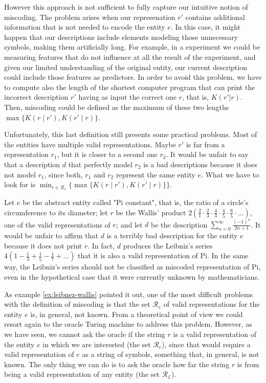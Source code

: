 However this approach is not sufficient to fully capture our intuitive notion of miscoding. The problem arises when our represenation $r'$ contains additional information that is not needed to encode the entity $e$. In this case, it might happen that our descriptions include elements modeling those unnecessary symbols, making them artificially long. For example, in a experiment we could be measuring features that do not influence at all the result of the experiment, and given our limited understanding of the original entity, our current description could include those features as predictors. In order to avoid this problem, we have to compute also the length of the shortest computer program that can print the incorrect description $r'$ having as input the correct one $r$, that is, $K(r'|r)$. Then, miscoding could be defined as the maximum of these two lengths $\max\{ K(r \mid r'), K(r' \mid r)\}$.

Unfortunately, this last definition still presents some practical problems. Most of the entities have multiple valid representations. Maybe $r'$ is far from a representation $r_1$, but it is closer to a second one $r_2$. It would be unfair to say that a description $d$ that perfectly model $r_2$ is a bad descriptions because it does not model $r_1$, since both, $r_1$ and $r_2$ represent the same entity $e$. What we have to look for is $\min_{r \in \mathcal{R}_e} \{ \max\{ K(r \mid r'), K(r' \mid r)\} \}$.

\begin{example}
\label{ex:leibnez-wallis}
Let $e$ be the abstract entity called "Pi constant", that is, the ratio of a circle's circumference to its diameter; let $r$ be the Wallis' product $2 (\frac{2}{1} \cdot \frac{2}{3} \cdot \frac{4}{3} \cdot \frac{4}{5} \cdot \frac{6}{5} \cdot \ldots)$, one of the valid representations of $e$; and let $d$ be the description $\sum_{n=0}^\infty \frac{(-1)^n}{2n+1}$. It would be unfair to affirm that $d$ is a terribly bad description for the entity $e$ because it does not print $r$. In fact, $d$ produces the Leibniz's series $4 (1 - \frac{1}{3} + \frac{1}{5} - \frac{1}{7} + \ldots)$ that it is also a valid representation of Pi. In the same way, the Leibniz's series should not be classified as miscoded representation of Pi, even in the hypothetical case that it were currently unknown by mathematicians.
\end{example}

As example \ref{ex:leibnez-wallis} pointed it out, one of the most difficult problems with the definition of miscoding is that the set $\mathcal{R}_e$ of valid representations for the entity $e$ is, in general, not known. From a theoretical point of view we could resort again to the oracle Turing machine to address this problem. However, as we have seen, we cannot ask the oracle if the string $r$ is a valid representation of the entity $e$ in which we are interested (the set $\mathcal{R}_e$), since that would require a valid representation of $e$ as a string of symbols, something that, in general, is not known. The only thing we can do is to ask the oracle how far the string $r$ is from being a valid representation of any entity (the set $\mathcal{R}_\mathcal{E}$).

